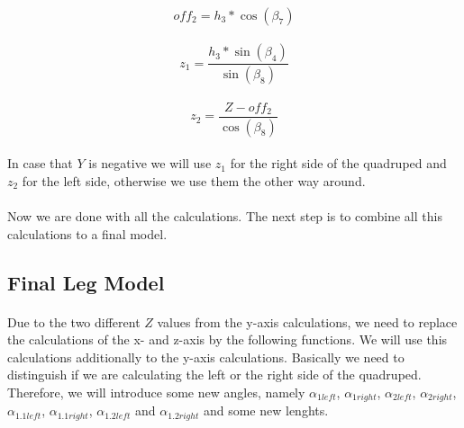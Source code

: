 \documentclass{article}
\begin{document}
    \paragraph{}
    \begin{equation}
        off_2 = h_3 * \cos(\beta_7)
    \end{equation}

    \paragraph{}
    \begin{equation}
        z_1 = \frac{h_3 * \sin(\beta_4)}{\sin(\beta_8)}
    \end{equation}

    \paragraph{}
    \begin{equation}
        z_2 = \frac{Z - off_2}{\cos(\beta_8)}
    \end{equation}

    \paragraph{}
    In case that $Y$ is negative we will use $z_1$ for the right side of the quadruped and $z_2$ for the left side, otherwise we use them the other way around.

    \paragraph{}
    Now we are done with all the calculations. The next step is to combine all this calculations to a final model. 
    


    \subsection{Final Leg Model}
    \paragraph{}
    Due to the two different $Z$ values from the y-axis calculations, we need to replace the calculations of the x- and z-axis by the following functions. We will use this calculations additionally to the y-axis calculations. Basically we need to distinguish if we are calculating the left or the right side of the quadruped. Therefore, we will introduce some new angles, namely $\alpha_{1left}$, $\alpha_{1right}$, $\alpha_{2left}$, $\alpha_{2right}$, $\alpha_{1.1left}$, $\alpha_{1.1right}$, $\alpha_{1.2left}$ and $\alpha_{1.2right}$ and some new lenghts.
\end{document}
